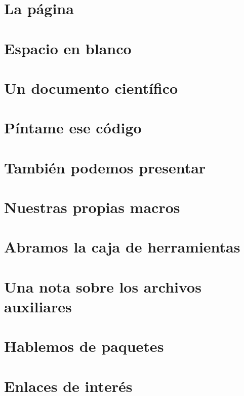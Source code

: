 \documentclass[a4paper,10pt]{book}
\begin{document}
\chapter{La página}


\chapter{Espacio en blanco}\label{ch:blanco}


\chapter{Un documento científico}


\chapter{Píntame ese código}


\chapter{También podemos presentar}


\chapter{Nuestras propias macros}


\chapter{Abramos la caja de herramientas}


\appendix
\chapter{Una nota sobre los archivos auxiliares}


\chapter{Hablemos de paquetes}


\chapter{Enlaces de interés}


\backmatter
% 
%
\end{document}
